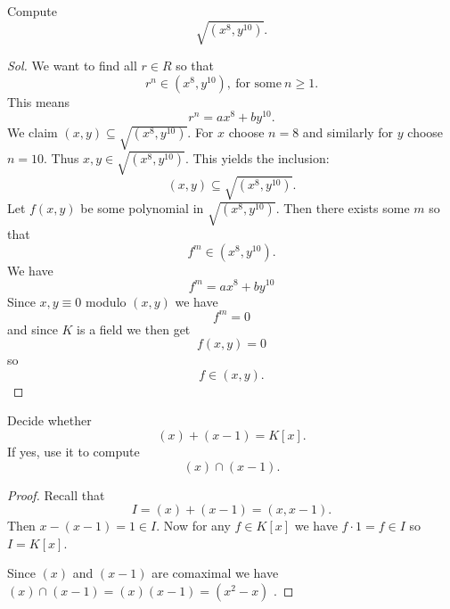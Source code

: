 \documentclass[11pt]{article}
\begin{document}
\begin{prob}
    Compute 
    \[
        \sqrt{(x^8, y^{10})}. 
    \]
\end{prob}
\begin{proof}[Sol]
    We want to find all $r \in R$ so that 
    \[
        r^n \in (x^8, y^10), \ \text{for some} \ n \geq 1. 
    \]
    This means 
    \[
        r^n = ax^8 + by^{10}.
    \]
    We claim $(x,y) \subseteq \sqrt{(x^8, y^{10})}$. 
    For $x$ choose $n = 8$ and similarly for $y$ choose 
    $n=10$. Thus $x,y \in \sqrt{(x^8, y^{10})}$. 
    This yields the inclusion: 
    \[
        (x,y) \subseteq \sqrt{(x^8, y^{10})}. 
    \]
    Let $f(x,y)$ be some polynomial in $\sqrt{(x^8, y^{10})}$. 
    Then there exists some $m$ so that 
    \[
    f^m \in (x^8, y^{10}). 
    \]
    We have 
    \[
        f^m = ax^8 + by^{10}
    \]
    Since $x,y \equiv 0$ modulo $(x,y)$ we have 
    \[
        f^m = 0
    \]
    and since $K$ is a field we then get 
    \[
        f(x,y) = 0
    \]
    so 
    \[
        f \in (x,y). 
    \]
\end{proof}

\begin{prob}
    Decide whether 
    \[
        (x) + (x-1) = K[x]. 
    \]
    If yes, use it to compute 
    \[
        (x) \cap (x-1).
    \]
\end{prob}
\begin{proof}
    Recall that 
    \[
        I = (x) + (x-1) = (x, x-1). 
    \]
    Then $x - (x - 1) = 1 \in I$. 
    Now for any $f \in K[x]$ we have 
    $f \cdot 1 = f \in I$ so $I = K[x]$. 

    Since $(x)$ and $(x-1)$ are comaximal we have 
    $(x) \cap (x-1) = (x)(x-1) = (x^2 - x)$ . 
\end{proof}
\end{document}
